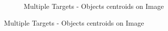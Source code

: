 \begin{figure}[t]
\begin{subfigure}{0.2\linewidth}
		\caption{Multiple Targets - Objects centroids on Image}
		\label{fig:sim4_centroid_objs}
	\end{subfigure}
\end{figure}